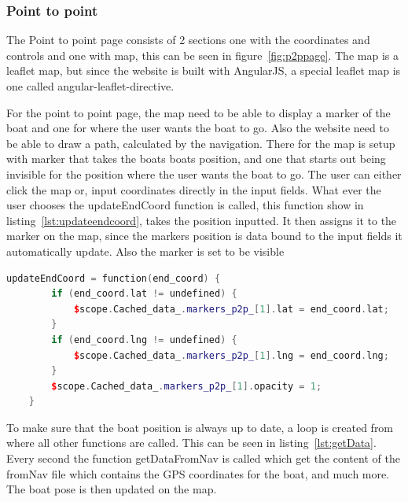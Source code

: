 \subsubsection{Point to point}

The Point to point page consists of 2 sections one with the coordinates and controls and one with map, this can be seen in figure~\ref{fig:p2ppage}. The map is a leaflet map, but since the website is built with AngularJS, a special leaflet map is one called angular-leaflet-directive\cite{leaflet}. 

For the point to point page, the map need to be able to display a marker of the boat and one for where the user wants the boat to go. Also the website need to be able to draw a path, calculated by the navigation. There for the map is setup with marker that takes the boats boats position, and one that starts out being invisible for the position where the user wants the boat to go. The user can either click the map or, input coordinates directly in the input fields. What ever the user chooses the updateEndCoord function is called, this function show in listing~\ref{lst:updateendcoord}, takes the position inputted. It then assigns it to the marker on the map, since the markers position is data bound to the input fields it automatically update. Also the marker is set to be visible 

\begin{lstlisting}[caption = {updateEndCoord in p2p.js}, captionpos=b, label={lst:updateendcoord}, language=C++,firstnumber=1]
updateEndCoord = function(end_coord) {
        if (end_coord.lat != undefined) {
            $scope.Cached_data_.markers_p2p_[1].lat = end_coord.lat;
        }
        if (end_coord.lng != undefined) {
            $scope.Cached_data_.markers_p2p_[1].lng = end_coord.lng;
        }
        $scope.Cached_data_.markers_p2p_[1].opacity = 1;
    }
\end{lstlisting}

To make sure that the boat position is always up to date, a loop is created from where all other functions are called. This can be seen in listing~\ref{lst:getData}. Every second the function getDataFromNav is called which get the content of the fromNav file which contains the GPS coordinates for the boat, and much more. The boat pose is then updated on the map.

